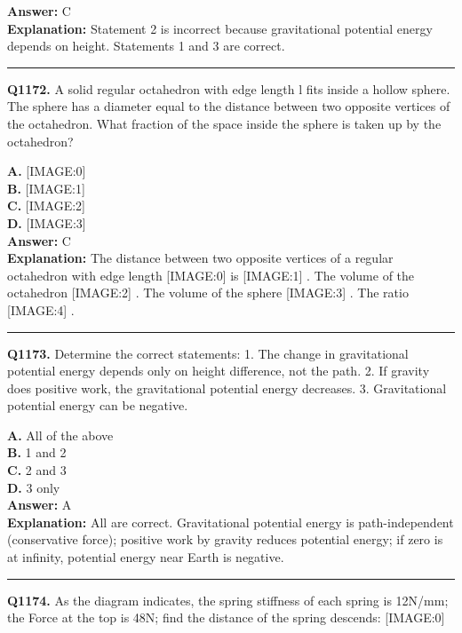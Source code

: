 \documentclass[12pt]{article}
\begin{document}
\textbf{Answer:} C \\
\textbf{Explanation:} Statement 2 is incorrect because gravitational potential energy depends on height. Statements 1 and 3 are correct.

\hrule
\vspace{1em}


\noindent
\textbf{Q1172.} A solid regular octahedron with edge length l fits inside a hollow sphere. The sphere has a diameter equal to the distance between two opposite vertices of the octahedron. What fraction of the space inside the sphere is taken up by the octahedron?



\textbf{A.} [IMAGE:0] \\
\textbf{B.} [IMAGE:1] \\
\textbf{C.} [IMAGE:2] \\
\textbf{D.} [IMAGE:3] \\

\textbf{Answer:} C \\
\textbf{Explanation:} The distance between two opposite vertices of a regular octahedron with edge length
[IMAGE:0]
is
[IMAGE:1]
. The volume of the octahedron
[IMAGE:2]
. The volume of the sphere
[IMAGE:3]
. The ratio
[IMAGE:4]
.

\hrule
\vspace{1em}


\noindent
\textbf{Q1173.} Determine the correct statements:
1.
The change in gravitational potential energy depends only on height difference, not the path.
2.
If gravity does positive work, the gravitational potential energy decreases.
3. Gravitational potential energy can be negative.



\textbf{A.} All of the above \\
\textbf{B.} 1 and 2 \\
\textbf{C.} 2 and 3 \\
\textbf{D.} 3 only \\

\textbf{Answer:} A \\
\textbf{Explanation:} All are correct. Gravitational potential energy is path-independent (conservative force); positive work by gravity reduces potential energy; if zero is at infinity, potential energy near Earth is negative.

\hrule
\vspace{1em}


\noindent
\textbf{Q1174.} As the diagram indicates, the spring stiffness of each spring is 12N/mm; the Force at the top is 48N; find the distance of the spring descends:
[IMAGE:0]
\end{document}
